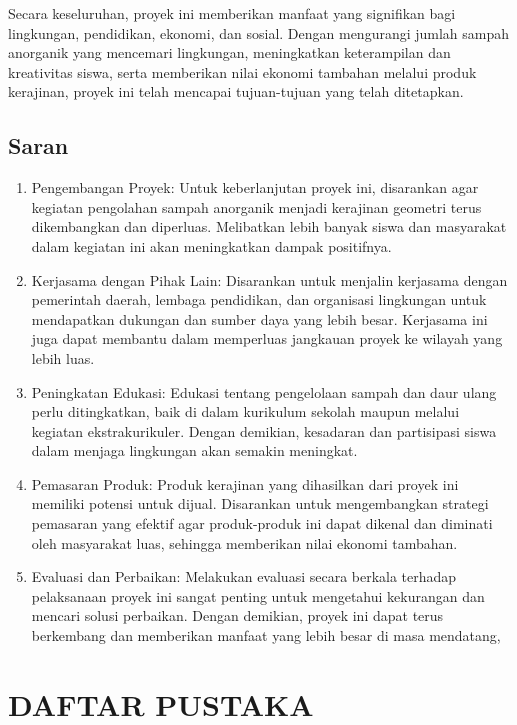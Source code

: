 \documentclass[a4paper,12pt, bahasa]{article}
\begin{document}
Secara keseluruhan, proyek ini memberikan manfaat yang signifikan bagi lingkungan, pendidikan, ekonomi, dan sosial. Dengan mengurangi jumlah sampah anorganik yang mencemari lingkungan, meningkatkan keterampilan dan kreativitas siswa, serta memberikan nilai ekonomi tambahan melalui produk kerajinan, proyek ini telah mencapai tujuan-tujuan yang telah ditetapkan. 
\subsection{Saran}
\begin{enumerate}
  \item     Pengembangan Proyek: Untuk keberlanjutan proyek ini, disarankan agar kegiatan pengolahan sampah anorganik menjadi kerajinan geometri terus dikembangkan dan diperluas. Melibatkan lebih banyak siswa dan masyarakat dalam kegiatan ini akan meningkatkan dampak positifnya. 
  \item     Kerjasama dengan Pihak Lain: Disarankan untuk menjalin kerjasama dengan pemerintah daerah, lembaga pendidikan, dan organisasi lingkungan untuk mendapatkan dukungan dan sumber daya yang lebih besar. Kerjasama ini juga dapat membantu dalam memperluas jangkauan proyek ke wilayah yang lebih luas. 
  \item     Peningkatan Edukasi: Edukasi tentang pengelolaan sampah dan daur ulang perlu ditingkatkan, baik di dalam kurikulum sekolah maupun melalui kegiatan ekstrakurikuler. Dengan demikian, kesadaran dan partisipasi siswa dalam menjaga lingkungan akan semakin meningkat. 
  \item     Pemasaran Produk: Produk kerajinan yang dihasilkan dari proyek ini memiliki potensi untuk dijual. Disarankan untuk mengembangkan strategi pemasaran yang efektif agar produk-produk ini dapat dikenal dan diminati oleh masyarakat luas, sehingga memberikan nilai ekonomi tambahan. 
  \item     Evaluasi dan Perbaikan: Melakukan evaluasi secara berkala terhadap pelaksanaan proyek ini sangat penting untuk mengetahui kekurangan dan mencari solusi perbaikan. Dengan demikian, proyek ini dapat terus berkembang dan memberikan manfaat yang lebih besar di masa mendatang\cite{GeometriArt},
\pagebreak
\end{enumerate}
    \section*{DAFTAR PUSTAKA}
    \medskip
    \printbibliography
\pagebreak
\end{document}
